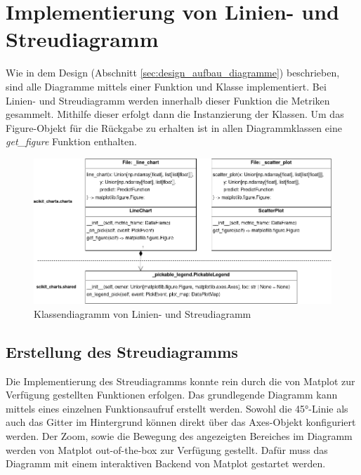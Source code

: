 \section{Implementierung von Linien- und Streudiagramm}
\label{sec:impl_line_scatter}

Wie in dem Design (Abschnitt \ref{sec:design_aufbau_diagramme}) beschrieben, sind alle Diagramme mittels einer Funktion und Klasse implementiert. Bei Linien- und Streudiagramm werden innerhalb dieser Funktion die Metriken gesammelt. Mithilfe dieser erfolgt dann die Instanzierung der Klassen. Um das Figure-Objekt für die Rückgabe zu erhalten ist in allen Diagrammklassen eine \emph{get\_figure} Funktion enthalten.\\

\begin{figure}[H]
    \centering
    \includegraphics[width=\textwidth]{images/uml_scatter_line_chart.png}
    \caption{Klassendiagramm von Linien- und Streudiagramm}
    \label{fig:uml_line_scatter}
\end{figure}

\subsection{Erstellung des Streudiagramms}
\label{subsec:impl_scatter}
\noindent Die Implementierung des Streudiagramms konnte rein durch die von Matplot zur Verfügung gestellten Funktionen erfolgen. Das grundlegende Diagramm kann mittels eines einzelnen Funktionsaufruf erstellt werden. Sowohl die 45°-Linie als auch das Gitter im Hintergrund können direkt über das Axes-Objekt konfiguriert werden. Der Zoom, sowie die Bewegung des angezeigten Bereiches im Diagramm werden von Matplot out-of-the-box zur Verfügung gestellt. Dafür muss das Diagramm mit einem interaktiven Backend von Matplot gestartet werden.

